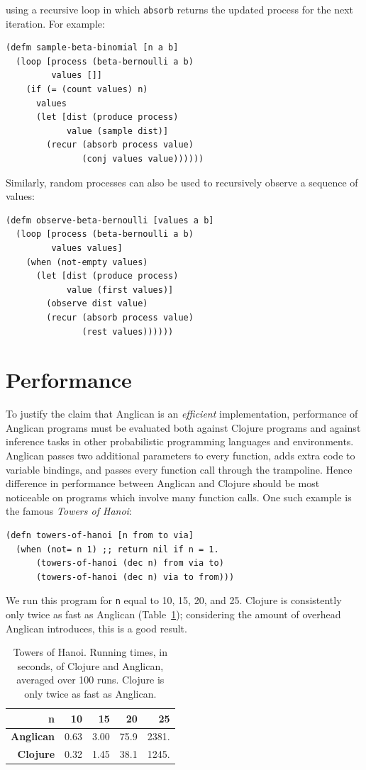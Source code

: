 \documentclass[sigconf]{acmart}
\begin{document}
using a recursive loop in which \texttt{absorb} returns the
updated process for the next iteration. For example:
\begin{lstlisting}[style=default]
(defm sample-beta-binomial [n a b]
  (loop [process (beta-bernoulli a b)
         values []]
    (if (= (count values) n)
      values
      (let [dist (produce process)
            value (sample dist)]
        (recur (absorb process value)
               (conj values value))))))
\end{lstlisting}
Similarly, random processes can also be used to recursively
observe a sequence of values:
\begin{lstlisting}[style=default]
(defm observe-beta-bernoulli [values a b]
  (loop [process (beta-bernoulli a b)
         values values] 
    (when (not-empty values)
      (let [dist (produce process)
            value (first values)]
        (observe dist value)
        (recur (absorb process value)
               (rest values))))))
\end{lstlisting}

\section{Performance}

To justify the claim that Anglican is an \textit{efficient}
implementation, performance of Anglican programs must be evaluated
both against Clojure programs and against inference tasks in
other probabilistic programming languages and environments.
Anglican passes two additional parameters to every function, adds
extra code to variable bindings, and passes every function
call through the trampoline. Hence difference in performance
between Anglican and Clojure should be most noticeable on
programs which involve many function calls. One such example is
the famous \textit{Towers of Hanoi}:

\begin{lstlisting}[style=default]
(defn towers-of-hanoi [n from to via]
  (when (not= n 1) ;; return nil if n = 1.
      (towers-of-hanoi (dec n) from via to)
      (towers-of-hanoi (dec n) via to from)))
\end{lstlisting}

We run this program for \texttt{n} equal to 10, 15, 20, and 25. Clojure
is consistently only twice as fast as Anglican
(Table~\ref{tbl:hanoi}); considering the amount of overhead
Anglican introduces, this is a good result.
\begin{table}[!b]
    \centering
    \begin{tabular}{r|r|r|r|r}
        {\bf n}  & 10 & 15 & 20 & 25 \\ \hline
        {\bf Anglican} & 0.63 & 3.00 & 75.9 & 2381.  \\ \hline
        {\bf Clojure} &  0.32 & 1.45 & 38.1  &  1245.
    \end{tabular}
    \caption{Towers of Hanoi. Running times, in
    seconds, of Clojure and Anglican, averaged over 100 runs.
    Clojure is only twice as fast as Anglican.}
    \label{tbl:hanoi}
\end{table}
\end{document}
